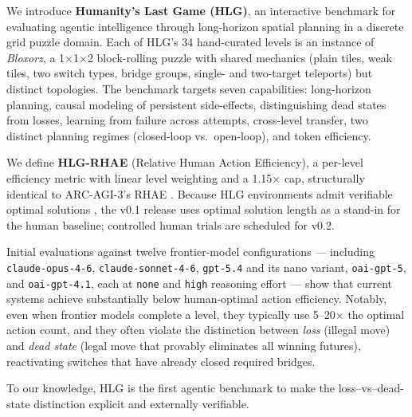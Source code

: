 We introduce \textbf{Humanity's Last Game (HLG)}, an interactive benchmark for evaluating
agentic intelligence through long-horizon spatial planning in a discrete grid puzzle
domain. Each of HLG's 34 hand-curated levels is an instance of \emph{Bloxorz}, a
1$\times$1$\times$2 block-rolling puzzle with shared mechanics (plain tiles, weak tiles,
two switch types, bridge groups, single- and two-target teleports) but distinct
topologies. The benchmark targets seven capabilities: long-horizon planning, causal
modeling of persistent side-effects, distinguishing dead states from losses, learning from
failure across attempts, cross-level transfer, two distinct planning regimes
(closed-loop vs.\ open-loop), and token efficiency.

We define \textbf{HLG-RHAE} (Relative Human Action Efficiency), a per-level efficiency
metric with linear level weighting and a 1.15$\times$ cap, structurally identical to
ARC-AGI-3's RHAE \cite{arcagi3}. Because HLG environments admit verifiable optimal
solutions \cite{tkoz0bloxorzsolver,grahambarrgrahambloxorz}, the v0.1 release uses optimal
solution length as a stand-in for the human baseline; controlled human trials are
scheduled for v0.2.

Initial evaluations against twelve frontier-model configurations — including
\texttt{claude-opus-4-6}, \texttt{claude-sonnet-4-6}, \texttt{gpt-5.4} and its nano
variant, \texttt{oai-gpt-5}, and \texttt{oai-gpt-4.1}, each at \texttt{none} and
\texttt{high} reasoning effort — show that current systems achieve substantially below
human-optimal action efficiency. Notably, even when frontier models complete a level,
they typically use 5--20$\times$ the optimal action count, and they often violate the
distinction between \emph{loss} (illegal move) and \emph{dead state} (legal move that
provably eliminates all winning futures), reactivating switches that have already closed
required bridges.

To our knowledge, HLG is the first agentic benchmark to make the loss--vs--dead-state
distinction explicit and externally verifiable.
